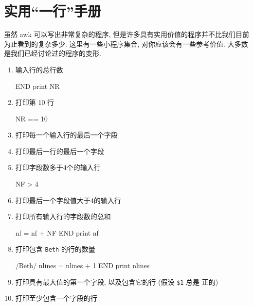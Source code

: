 \section{实用``一行''手册}
\label{sec:a_handful_of_useful_one_liners}

虽然 awk 可以写出非常复杂的程序, 但是许多具有实用价值的程序并不比我们目前
为止看到的复杂多少. 这里有一些小程序集合, 对你应该会有一些参考价值. 大多数
是我们已经讨论过的程序的变形.
\begin{enumerate}
\item 输入行的总行数
\begin{awkcode}
    END { print NR }
\end{awkcode}
\item 打印第 10 行
\begin{awkcode}
    NR == 10
\end{awkcode}
\item 打印每一个输入行的最后一个字段
\item 打印最后一行的最后一个字段
\item 打印字段数多于4个的输入行
\begin{awkcode}
    NF > 4
\end{awkcode}
\item 打印最后一个字段值大于4的输入行
\item 打印所有输入行的字段数的总和
\begin{awkcode}
    { nf = nf + NF }
    END { print nf }
\end{awkcode}
\item 打印包含 \texttt{Beth} 的行的数量
\begin{awkcode}
    /Beth/ { nlines = nlines + 1 }
    END { print nlines }
\end{awkcode}
\item 打印具有最大值的第一个字段, 以及包含它的行 (假设 \verb'$1' 总是
    正的)
\item 打印至少包含一个字段的行
\begin{awkcode}

\end{awkcode}
\end{enumerate}
